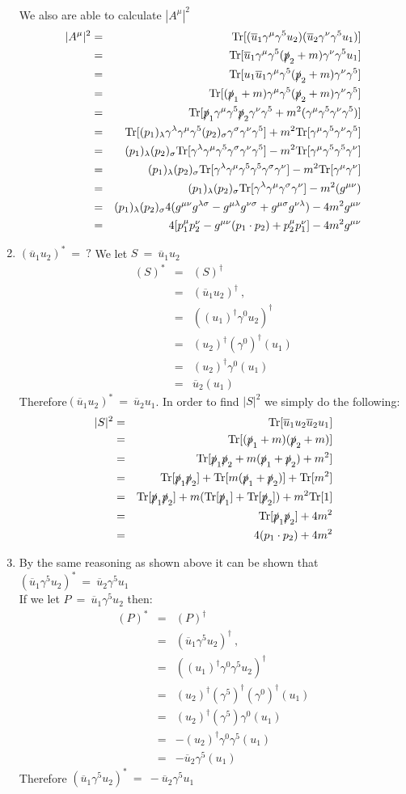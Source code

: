 \documentclass[12pt]{article}
\def \bea{\begin{eqnarray}}
\def \eea{\end{eqnarray}}
\def \Tr{{\rm Tr}}
\def \nn{\nonumber}
\def \nl{\nn \\}
\def \ou{\overline{u}}
\def \ga{\gamma}
\def \la{\lambda}
\def \si{\sigma}
\begin{document}
\begin{enumerate}
We also are able to calculate $|A^\mu|^2$
\bea
|A^{\mu}|^2 &=& \Tr[(\ou_1\ga^\mu \ga^5 u_2)(\ou_2 \ga^\nu \ga^5 u_1)] \\
&=& \Tr[\ou_1\ga^\mu \ga^5 (\slashed{p}_2+m) \ga^\nu \ga^5 u_1]  \nl
&=&\Tr[u_1\ou_1\ga^\mu \ga^5 (\slashed{p}_2+m) \ga^\nu \ga^5 ]\nl
&=&\Tr[(\slashed{p}_1+m)\ga^\mu \ga^5 (\slashed{p}_2+m) \ga^\nu \ga^5 ]\nl
&=&\Tr[\slashed{p}_1\ga^\mu\ga^5 \slashed{p}_2\ga^\nu \ga^5 + m^2(\ga^\mu\ga^5\ga^\nu \ga^5)] \nl
&=& \Tr[(p_1)_\la\ga^\la\ga^\mu\ga^5 (p_2)_\si\ga^\si\ga^\nu \ga^5] + m^2\Tr[\ga^\mu\ga^5\ga^\nu \ga^5]\nl
&=& (p_1)_\la(p_2)_\si \Tr[\ga^\la\ga^\mu\ga^5 \ga^\si\ga^\nu \ga^5] - m^2\Tr[\ga^\mu\ga^5\ga^5 \ga^\nu]\nl
&=& (p_1)_\la(p_2)_\si \Tr[\ga^\la\ga^\mu\ga^5\ga^5 \ga^\si\ga^\nu] - m^2\Tr[\ga^\mu\ga^\nu]\nl
&=& (p_1)_\la(p_2)_\si \Tr[\ga^\la\ga^\mu\ga^\si\ga^\nu] - m^2(g^{\mu\nu})\nl
&=& (p_1)_\la(p_2)_\si 4(g^{\mu\nu}g^{\la\si} - g^{\mu\la} g^{\nu\si} + g^{\mu\si}g^{\nu\la}) - 4m^2g^{\mu\nu}\nl
&=& 4[p_1^\mu p_2^\nu - g^{\mu\nu}(p_1 \cdot p_2) + p_2^\mu p_1^\nu] - 4m^2g^{\mu\nu} 
\eea

\item $ (\ou_1 u_2)^* ~=~ ?$
We let $S ~=~ \ou_1 u_2$
\bea
(S)^* &=& (S)^\dag \\
&=& (\ou_1 u_2)^\dag ~,~~ \nl
&=& ((u_1)^\dag\ga^0 u_2)^\dag \nl
&=& (u_2)^\dag(\ga^0)^\dag(u_1)\nl
&=& (u_2)^\dag\ga^0(u_1)\nl
&=& \ou_2(u_1)
\eea
Therefore$(\ou_1 u_2)^* ~=~ \ou_2 u_1$.
In order to find $|S|^2$ we simply do the following:
\bea
|S|^2&=& \Tr[\ou_1 u_2 \ou_2 u_1]  \\
&=& \Tr[(\slashed{p}_1+m)(\slashed{p}_2+m)] \nl
&=& \Tr[\slashed{p}_1\slashed{p}_2+m(\slashed{p}_1+\slashed{p}_2)+m^2]\nl
&=& \Tr[\slashed{p}_1\slashed{p}_2]+\Tr[m(\slashed{p}_1+\slashed{p}_2)]+\Tr[m^2] \nl
&=& \Tr[\slashed{p}_1\slashed{p}_2]+m(\Tr[\slashed{p}_1]+\Tr[\slashed{p}_2])+m^2\Tr[1] \nl
&=& \Tr[\slashed{p}_1\slashed{p}_2]+4m^2 \nl
&=& 4(p_1 \cdot p_2)+4m^2
\eea

\item  By the same reasoning as shown above it can be shown that $(\ou_1 \ga^5 u_2)^* ~=~ \ou_2 \ga^5 u_1$ \\
If we let $P ~=~ \ou_1\ga^5 u_2$ then:
\bea
(P)^* &=& (P)^\dag \\
&=& (\ou_1\ga^5 u_2)^\dag ~,~~ \nl
&=& ((u_1)^\dag\ga^0\ga^5 u_2)^\dag \nl
&=& (u_2)^\dag(\ga^5)^\dag (\ga^0)^\dag(u_1)\nl
&=& (u_2)^\dag(\ga^5) \ga^0(u_1)\nl
&=& -(u_2)^\dag \ga^0\ga^5(u_1)\nl
&=& -\ou_2\ga^5(u_1)
\eea
Therefore  $(\ou_1 \ga^5 u_2)^* ~=~ -\ou_2 \ga^5 u_1$


\end{enumerate}
\end{document}
